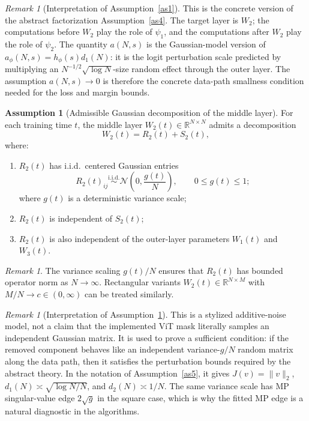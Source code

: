 \documentclass[11pt]{article}
\theoremstyle{plain}
\theoremstyle{definition}
\newtheorem{assumption}[thm]{Assumption}
\theoremstyle{remark}
\newtheorem{rem}[thm]{Remark}
\newcommand{\R}{\mathbb{R}}
\newcommand{\1}{\mathbf{1}}
\begin{document}
\begin{rem}[Interpretation of Assumption~\ref{as1}]
This is the concrete version of the abstract factorization Assumption~\ref{as4}.  The target layer is \(W_2\); the computations before \(W_2\) play the role of \(\psi_1\), and the computations after \(W_2\) play the role of \(\psi_2\).  The quantity \(a(N,s)\) is the Gaussian-model version of \(a_\phi(N,s)=h_\phi(s)d_1(N)\): it is the logit perturbation scale predicted by multiplying an \(N^{-1/2}\sqrt{\log N}\)-size random effect through the outer layer.  The assumption \(a(N,s)\to0\) is therefore the concrete data-path smallness condition needed for the loss and margin bounds.
\end{rem}

\begin{assumption}[Admissible Gaussian decomposition of the middle layer]
\label{as2}
For each training time \(t\), the middle layer \(W_2(t)\in\R^{N\times N}\) admits a decomposition
\[
W_2(t)=R_2(t)+S_2(t),
\]
where:
\begin{enumerate}[leftmargin=2em]
\item \(R_2(t)\) has i.i.d.\ centered Gaussian entries
\[
R_2(t)_{ij}\overset{\mathrm{i.i.d.}}{\sim}\mathcal N\!\left(0,\frac{g(t)}{N}\right),
\qquad 0\le g(t)\le 1;
\]
where \(g(t)\) is a deterministic variance scale;
\item \(R_2(t)\) is independent of \(S_2(t)\);
\item \(R_2(t)\) is also independent of the outer-layer parameters \(W_1(t)\) and \(W_3(t)\).
\end{enumerate}
\end{assumption}

\begin{rem}
The variance scaling \(g(t)/N\) ensures that \(R_2(t)\) has bounded operator norm as \(N\to\infty\). Rectangular variants \(W_2(t)\in\R^{N\times M}\) with \(M/N\to c\in(0,\infty)\) can be treated similarly.
\end{rem}

\begin{rem}[Interpretation of Assumption~\ref{as2}]
This is a stylized additive-noise model, not a claim that the implemented ViT mask literally samples an independent Gaussian matrix.  It is used to prove a sufficient condition: if the removed component behaves like an independent variance-\(g/N\) random matrix along the data path, then it satisfies the perturbation bounds required by the abstract theory.  In the notation of Assumption~\ref{as5}, it gives \(J(v)=\|v\|_2\), \(d_1(N)\asymp\sqrt{\log N/N}\), and \(d_2(N)\asymp1/N\).  The same variance scale has MP singular-value edge \(2\sqrt g\) in the square case, which is why the fitted MP edge is a natural diagnostic in the algorithms.
\end{rem}
\end{document}

